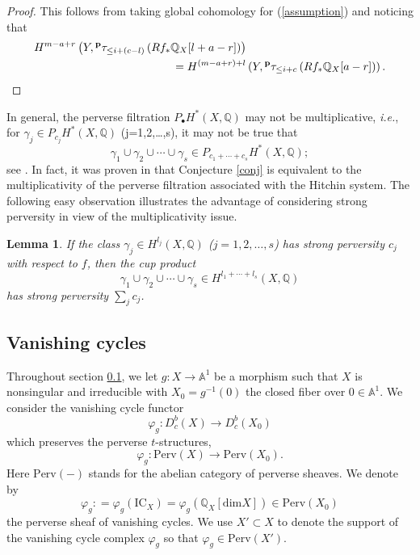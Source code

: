 \documentclass[11pt]{amsart}
\theoremstyle{plain}
\newtheorem{lem}[thm]{Lemma}
\theoremstyle{definition}
\theoremstyle{remark}
\newcommand{\BA}{{\mathbb{A}}}
\newcommand{\BQ}{{\mathbb{Q}}}
\begin{document}
\begin{proof}
This follows from taking global cohomology for (\ref{assumption}) and noticing that
\begin{align*}
    H^{m-a+r}\left(Y, {^\mathbf{p}\tau_{\leq i+(c-l)}} \left(Rf_* \BQ_X  [l+a-r] \right)\right) & \\ = H^{(m-a+r)+l}&\left(Y, {^\mathbf{p}\tau_{\leq i+c}} \left(Rf_* \BQ_X  [a-r] \right)\right). \qedhere
    \end{align*}
\end{proof}

In general, the perverse filtration $P_\bullet H^*(X, \BQ)$ may not be multiplicative, \emph{i.e.}, for $\gamma_j \in P_{c_j}H^*(X, \BQ)$ (j=1,2,\dots,s), it may not be true that
\[
\gamma_1 \cup \gamma_2 \cup \cdots \cup \gamma_s \in P_{c_1+\cdots+c_s}H^*(X, \BQ);
\]
see \cite[Exercise 5.6.8]{Park}. In fact, it was proven in \cite[Theorem 0.6]{dCMS} that Conjecture \ref{conj} is equivalent to the multiplicativity of the perverse filtration associated with the Hitchin system. The following easy observation illustrates the advantage of considering strong perversity in view of the multiplicativity issue.

\begin{lem}\label{lem1.2}
If the class $\gamma_j \in H^{l_j}(X, \BQ)$ ($j=1,2,\dots, s$) has strong perversity $c_j$ with respect to $f$, then the cup product 
\[
\gamma_1 \cup \gamma_2 \cup \cdots \cup \gamma_s \in H^{l_1+\cdots+l_s}(X, \BQ)
\]
has strong perversity $\sum_jc_j$.
\end{lem}


\subsection{Vanishing cycles}\label{Sec1.2}

Throughout section \ref{Sec1.2}, we let $g: X \to \BA^1$ be a morphism such that $X$ is nonsingular and irreducible with $X_0 = g^{-1}(0)$ the closed fiber over $0 \in \BA^1$. We consider the vanishing cycle functor 
\[
\varphi_g: D^b_c(X) \rightarrow D^b_c(X_0)
\]
which preserves the perverse $t$-structures,
\[
\varphi_g: \mathrm{Perv}(X) \rightarrow \mathrm{Perv}(X_0).
\]
Here $\mathrm{Perv}(-)$ stands for the abelian category of perverse sheaves. We denote by 
\[
\varphi_g : = \varphi_g(\mathrm{IC}_X) = \varphi_g(\BQ_X[\mathrm{dim}X]) \in \mathrm{Perv}(X_0) \]
the perverse sheaf of vanishing cycles. We use $X' \subset X$ to denote the support of the vanishing cycle complex $\varphi_g$ so that $\varphi_g \in \mathrm{Perv}(X')$.
\end{document}
